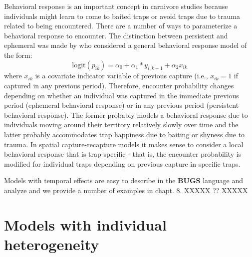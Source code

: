 Behavioral response is an important concept in carnivore studies
because individuals might learn to come to baited traps or avoid traps
due to trauma related to being encountered.  There are a number of
ways to parameterize a behavioral response to encounter. The
distinction between persistent and ephemeral was made by
\citet{yang_chao:2005} who considered a general behavioral response
model of the form:
\[
\mbox{logit}(p_{ik}) = \alpha_{0} + \alpha_{1}*y_{i,k-1} + \alpha_{2} x_{ik}
\]
where $x_{ik}$ is a covariate indicator variable of previous capture
(i.e., $x_{ik} = 1$ if captured in any previous period). Therefore,
encounter probability changes depending on whether an individual was
captured in the immediate previous period (ephemeral behavioral
response) or in any previous period (persistent behavioral
response). The former probably models a behavioral response due to
individuals moving around their territory relatively slowly over time
and the latter probably accommodates trap happiness due to baiting or
shyness due to trauma.  In spatial capture-recapture models it makes
sense to consider a local behavioral response that is trap-specific
\citep{royle_etal:2011jwm} - that is, the encounter probability is
modified for individual traps depending on previous capture in
specific traps.

Models with temporal effects are easy to describe in the {\bf BUGS} language
and analyze and we provide a number of examples in chapt. 8. XXXXX ?? XXXXX


\section{ Models with individual heterogeneity}
\label{closed.sec.modelmh}




